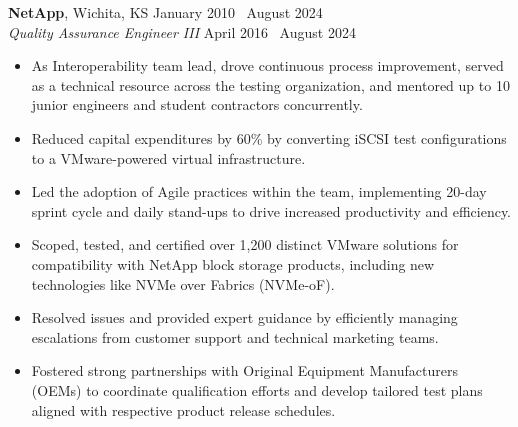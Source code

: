 \documentclass[10pt]{article}       %
\begin{document}
\textbf{NetApp}, Wichita, KS \hfill January 2010 \textendash\ August 2024 \\
\vspace{1pt}
\textit{Quality Assurance Engineer III} \hfill April 2016 \textendash\ August 2024 \\
\vspace{-6.5pt}
\begin{itemize}
  \item As Interoperability team lead, drove continuous process improvement, served as a technical resource across the testing organization, and mentored up to 10 junior engineers and student contractors concurrently.
  \item Reduced capital expenditures by 60\% by converting iSCSI test configurations to a VMware-powered virtual infrastructure.
  \item Led the adoption of Agile practices within the team, implementing 20-day sprint cycle and daily stand-ups to drive increased productivity and efficiency.
  \item Scoped, tested, and certified over 1,200 distinct VMware solutions for compatibility with NetApp block storage products, including new technologies like NVMe over Fabrics (NVMe-oF).
  \item Resolved issues and provided expert guidance by efficiently managing escalations from customer support and technical marketing teams.
  \item Fostered strong partnerships with Original Equipment Manufacturers (OEMs) to coordinate qualification efforts and develop tailored test plans aligned with respective product release schedules.
\end{itemize}
\end{document}
